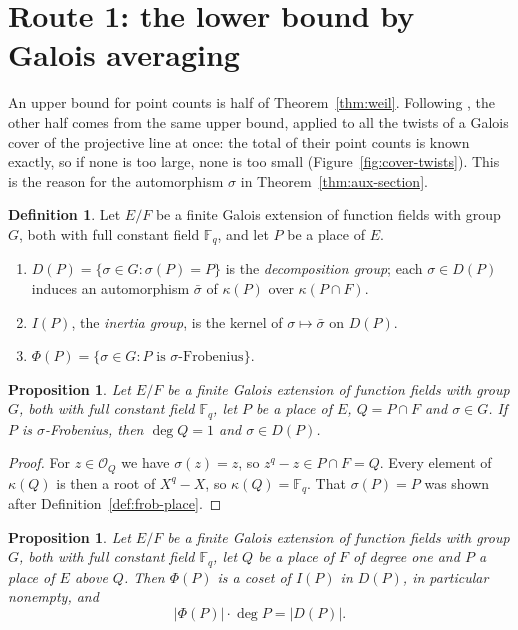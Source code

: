 \documentclass[11pt]{amsbook}
\theoremstyle{plain}
\newtheorem{proposition}[theorem]{Proposition}
\theoremstyle{definition}
\newtheorem{definition}[theorem]{Definition}
\theoremstyle{remark}
\numberwithin{equation}{section}
\numberwithin{figure}{chapter}
\numberwithin{table}{chapter}
\newcommand{\F}{\mathbb{F}}
\newcommand{\calO}{\mathcal{O}}
\begin{document}
\section{Route 1: the lower bound by Galois averaging}
\label{sec:route1}

An upper bound for point counts is half of
Theorem~\ref{thm:weil}. Following \cite[p.~240]{Bombieri1974}, the
other half comes from the same upper bound, applied to all the
twists of a Galois cover of the projective line at once: the total
of their point counts is known exactly, so if none is too large,
none is too small (Figure~\ref{fig:cover-twists}). This is the
reason for the automorphism $\sigma$ in
Theorem~\ref{thm:aux-section}.

\begin{definition}\label{def:decomposition}
Let $E/F$ be a finite Galois extension of function fields with
group $G$, both with full constant field $\F_q$, and let $P$ be a
place of $E$.
\begin{enumerate}
\item $D(P)=\{\sigma\in G:\sigma(P)=P\}$ is the \emph{decomposition
group}; each $\sigma\in D(P)$ induces an automorphism $\bar\sigma$
of $\kappa(P)$ over $\kappa(P\cap F)$.
\item $I(P)$, the \emph{inertia group}, is the kernel of
$\sigma\mapsto\bar\sigma$ on $D(P)$.
\item $\Phi(P)=\{\sigma\in G:P\text{ is }\sigma\text{-Frobenius}\}$.
\end{enumerate}
\end{definition}

\begin{proposition}\label{prop:frob-place-base}
Let $E/F$ be a finite Galois extension of function fields with
group $G$, both with full constant field $\F_q$, let $P$ be a place
of $E$, $Q=P\cap F$ and $\sigma\in G$. If $P$ is
$\sigma$-Frobenius, then $\deg Q=1$ and $\sigma\in D(P)$.
\end{proposition}

\begin{proof}
For $z\in\calO_Q$ we have $\sigma(z)=z$, so $z^q-z\in P\cap F=Q$.
Every element of $\kappa(Q)$ is then a root of $X^q-X$, so
$\kappa(Q)=\F_q$. That $\sigma(P)=P$ was shown after
Definition~\ref{def:frob-place}.
\end{proof}

\begin{proposition}\label{prop:frob-coset}
Let $E/F$ be a finite Galois extension of function fields with
group $G$, both with full constant field $\F_q$, let $Q$ be a place
of $F$ of degree one and $P$ a place of $E$ above $Q$. Then
$\Phi(P)$ is a coset of $I(P)$ in $D(P)$, in particular nonempty,
and
\begin{equation}\label{eq:frob-coset}
\lvert\Phi(P)\rvert\cdot\deg P=\lvert D(P)\rvert.
\end{equation}
\end{proposition}
\end{document}
